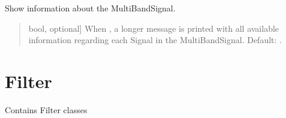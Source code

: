 \documentclass[letterpaper,10pt,english]{sphinxmanual}
\begin{document}
\begin{fulllineitems}
\begin{fulllineitems}
\label{\detokenize{classes:dsptools.classes.multibandsignal.MultiBandSignal.show_info}}
\pysigstartsignatures
{}
\pysigstopsignatures
\sphinxAtStartPar
Show information about the MultiBandSignal.
\begin{quote}\begin{description}
\begin{description}
\sphinxlineitem{\sphinxstylestrong{show\_band\_info}}{[}bool, optional{]}
\sphinxAtStartPar
When , a longer message is printed with all available
information regarding each Signal in the MultiBandSignal.
Default: .

\end{description}

\end{description}\end{quote}

\end{fulllineitems}


\end{fulllineitems}



\section{Filter}
\label{\detokenize{classes:module-dsptools.classes.filter_class}}\label{\detokenize{classes:filter}}
\sphinxAtStartPar
Contains Filter classes
\end{document}

